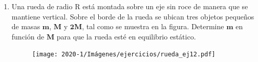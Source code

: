 \documentclass[letterpaper,11pt]{article}
\begin{document}
\begin{enumerate}
\item Una rueda de radio R está montada sobre un eje sin roce de manera que se mantiene vertical. Sobre el borde de la rueda se ubican tres objetos pequeños de masas $\mathbf{m}$, $\mathbf{M}$ y $\mathbf{2M}$, tal como se muestra en la figura. Determine $\mathbf{m}$ en función de $\mathbf{M}$ para que la rueda esté en equilibrio estático.

    \begin{figure}[h!]
        \centering
        \texttt{[image: 2020-1/Imágenes/ejercicios/rueda\_ej12.pdf]}
    \end{figure}

\end{enumerate}
\end{document}
